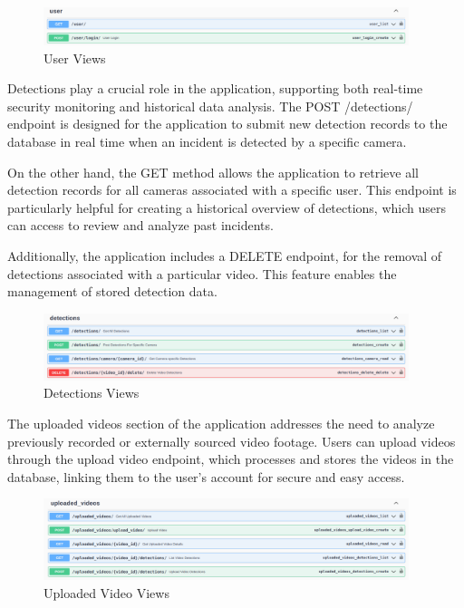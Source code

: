\begin{figure}[h]
    \centering 
    \includegraphics[width=0.95\textwidth]{figs/views-user.png} 
    \caption{User Views}
    \label{fig:views-user}
\end{figure}

Detections play a crucial role in the application, supporting both real-time security monitoring and 
historical data analysis. The POST /detections/ endpoint is designed for the application to 
submit new detection records to the database in real time when an incident is detected by a specific camera.

On the other hand, the GET method allows the application to retrieve all detection records for all cameras associated 
with a specific user. This endpoint is particularly helpful for creating a historical overview of detections,
which users can access to review and analyze past incidents.

Additionally, the application includes a DELETE endpoint, for the 
removal of detections associated with a particular video. This feature enables the management of stored detection data. 
\begin{figure}[h]
    \centering 
    \includegraphics[width=0.95\textwidth]{figs/views-detections.png} 
    \caption{Detections Views}
    \label{fig:views-detections}
\end{figure}


The uploaded videos section of the application addresses the need to analyze previously recorded or 
externally sourced video footage. Users can upload videos through the upload video endpoint, which processes and 
stores the videos in the database, linking them to the user's account for secure and easy access.
\begin{figure}[h]
    \centering 
    \includegraphics[width=0.95\textwidth]{figs/views-videos.png} 
    \caption{Uploaded Video Views}
    \label{fig:views-video}
\end{figure}

